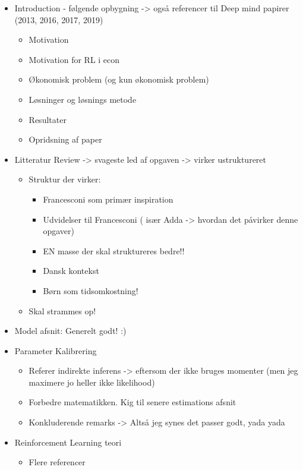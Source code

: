 \documentclass{article}
\begin{document}
\begin{itemize}
    \item Introduction - følgende opbygning -> også referencer til Deep mind papirer (2013, 2016, 2017, 2019)
    \begin{itemize}
        \item Motivation
        \item Motivation for RL i econ
        \item Økonomisk problem (og kun økonomisk problem)
        \item Løsninger og løsnings metode
        \item Resultater
        \item Opridsning af paper
    \end{itemize}
    \item Litteratur Review -> svageste led af opgaven -> virker ustruktureret
    \begin{itemize}
        \item Struktur der virker:
        \begin{itemize}
            \item Francesconi som primær inspiration
            \item Udvidelser til Francesconi ( især Adda -> hvordan det påvirker denne opgaver)
            \item EN masse der skal struktureres bedre!!
            \item Dansk kontekst
            \item Børn som tidsomkostning!
        \end{itemize}
        \item Skal strammes op!
    \end{itemize}
    \item Model afsnit: Generelt godt! :)
    \item Parameter Kalibrering
    \begin{itemize}
        \item Referer indirekte inferens -> eftersom der ikke bruges momenter (men jeg maximere jo heller ikke likelihood)
        \item Forbedre matematikken. Kig til senere estimations afsnit
        \item Konkluderende remarks -> Altså jeg synes det passer godt, yada yada
    \end{itemize}
    \item Reinforcement Learning teori
    \begin{itemize}
        \item Flere referencer

\end{itemize}
\end{itemize}
\end{document}
